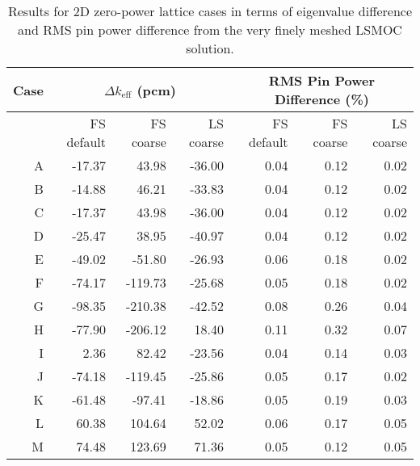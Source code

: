 {{{            \begin{table}[h]
                \centering
                \caption{Results for 2D zero-power lattice cases in terms of eigenvalue difference and RMS pin power difference from the very finely meshed \ac{LSMOC} solution.}
                \label{tab:Results:LSA:Zero Power Lattice Results}
                \begin{tabular}{rrrr@{\hskip 1cm}rrr}
                    \toprule
                    Case    & \multicolumn{3}{c}{$\Delta k_{\text{eff}}$ (pcm)} & \multicolumn{3}{c}{RMS Pin Power Difference (\%)}\\\midrule
                            & FS default   & FS coarse & LS coarse &  FS default   & FS coarse & LS coarse\\\midrule
                          A &    -17.37 &     43.98 &    -36.00 &      0.04 &      0.12 &      0.02\\
                          B &    -14.88 &     46.21 &    -33.83 &      0.04 &      0.12 &      0.02\\
                          C &    -17.37 &     43.98 &    -36.00 &      0.04 &      0.12 &      0.02\\
                          D &    -25.47 &     38.95 &    -40.97 &      0.04 &      0.12 &      0.02\\
                          E &    -49.02 &    -51.80 &    -26.93 &      0.06 &      0.18 &      0.02\\
                          F &    -74.17 &   -119.73 &    -25.68 &      0.05 &      0.18 &      0.02\\
                          G &    -98.35 &   -210.38 &    -42.52 &      0.08 &      0.26 &      0.04\\
                          H &    -77.90 &   -206.12 &     18.40 &      0.11 &      0.32 &      0.07\\
                          I &      2.36 &     82.42 &    -23.56 &      0.04 &      0.14 &      0.03\\
                          J &    -74.18 &   -119.45 &    -25.86 &      0.05 &      0.17 &      0.02\\
                          K &    -61.48 &    -97.41 &    -18.86 &      0.05 &      0.19 &      0.03\\
                          L &     60.38 &    104.64 &     52.02 &      0.06 &      0.17 &      0.05\\
                          M &     74.48 &    123.69 &     71.36 &      0.05 &      0.12 &      0.05\\

\end{tabular}
\end{table}}}}
